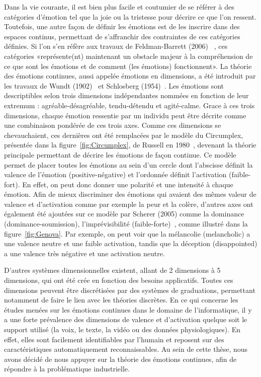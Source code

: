 
Dans la vie courante, il est bien plus facile et coutumier de se référer à des catégories d'émotion tel que la joie ou la tristesse pour décrire ce que l'on ressent. Toutefois, une autre façon de définir les émotions est de les inscrire dans des espaces continus, permettant de s'affranchir des contraintes de ces catégories définies. Si l'on s'en réfère aux travaux de Feldman-Barrett (2006)~\cite{Feldman2006} , ces catégories «représente(nt) maintenant un obstacle majeur à la compréhension de ce que sont les émotions et de comment (les émotions) fonctionnent».
La théorie des émotions continues, aussi appelée émotions en dimensions, a été introduit par les travaux de Wundt (1902)~\cite{Wundt1902} et Schlosberg (1954)~\cite{Schlosberg1954}. Les émotions sont descriptibles selon trois dimensions indépendantes nommées en fonction de leur extremum : agréable-désagréable, tendu-détendu et agité-calme. Grace à ces trois dimensions, chaque émotion ressentie par un individu peut être décrite comme une combinaison pondérée de ces trois axes.  Comme ces dimensions se chevauchaient, ces dernières ont été remplacées par le modèle du Circumplex, présentée dans la figure~\ref{fig:Circumplex}, de Russell en 1980~\cite{Russell1980}, devenant la théorie principale permettant de décrire les émotions de façon continue. Ce modèle permet de placer toutes les émotions au sein d'un cercle dont l'abscisse définit la valence de l'émotion (positive-négative) et l'ordonnée définit l'activation (faible-fort). En effet, on peut donc donner une polarité et une intensité à chaque émotion. Afin de mieux discriminer des émotions qui avaient des mêmes valeur de valence et d'activation comme par exemple la peur et la colère, d'autres axes ont également été ajoutées sur ce modèle par Scherer (2005) comme la dominance (dominance-soumission), l'imprévisibilité (faible-forte)~\cite{Scherer2005}, comme illustré dans la figure~\ref{fig:Genova}. Par exemple, on peut voir que la mélancolie (melancholic) a une valence neutre et une faible activation, tandis que la déception (disappointed) a une valence très négative et une activation neutre.

D'autres systèmes dimensionnelles existent, allant de 2 dimensions à 5 dimensions, qui ont été crée en fonction des besoins applicatifs. Toutes ces dimensions peuvent être discrétisées par des systèmes de graduations, permettant notamment de faire le lien avec les théories discrètes.
En ce qui concerne les études menées sur les émotions continues dans le domaine de l'informatique, il y a une forte prévalence des dimensions de valence et d'activation quelque soit le support utilisé (la voix, le texte, la vidéo ou des données physiologiques). En effet, elles sont facilement identifiables par l'humain et reposent sur des caractéristiques automatiquement reconnaissables. Au sein de cette thèse, nous avons décidé de nous appuyer sur la théorie des émotions continues, afin de répondre à la problématique industrielle.


